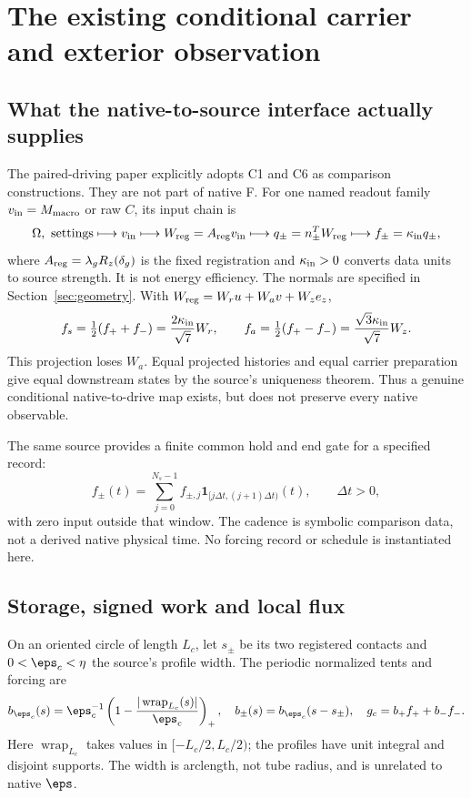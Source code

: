 \section{The existing conditional carrier and exterior observation}
\subsection{What the native-to-source interface actually supplies}
The paired-driving paper \cite{pairedII} explicitly adopts C1 and C6 as comparison constructions. They are not part of native F. For one named readout family $v_{\rm in}=M_{\rm macro}$ or raw $C$, its input chain is
\begin{equation}\label{eq:input}
 \Omega,\text{ settings}\longmapsto v_{\rm in}\longmapsto
 W_{\rm reg}=A_{\rm reg}v_{\rm in}\longmapsto
 q_\pm=n_\pm^TW_{\rm reg}\longmapsto f_\pm=\kappa_{\rm in}q_\pm,
\end{equation}
where $A_{\rm reg}=\lambda_gR_z(\delta_g)$ is the fixed registration and $\kappa_{\rm in}>0$ converts data units to source strength. It is not energy efficiency. The normals are specified in Section~\ref{sec:geometry}. With $W_{\rm reg}=W_ru+W_av+W_z e_z$,
\begin{equation}\label{eq:sectors}
 f_s=\tfrac12(f_++f_-)=\frac{2\kappa_{\rm in}}{\sqrt7}W_r,
 \qquad f_a=\tfrac12(f_+-f_-)=\frac{\sqrt3\kappa_{\rm in}}{\sqrt7}W_z.
\end{equation}
This projection loses $W_a$. Equal projected histories and equal carrier preparation give equal downstream states by the source's uniqueness theorem. Thus a genuine conditional native-to-drive map exists, but does not preserve every native observable.

The same source provides a finite common hold and end gate for a specified record:
\begin{equation}\label{eq:hold}
 f_\pm(t)=\sum_{j=0}^{N_s-1}f_{\pm,j}\mathbf1_{[j\Delta t,(j+1)\Delta t)}(t),
 \qquad \Delta t>0,
\end{equation}
with zero input outside that window. The cadence is symbolic comparison data, not a derived native physical time. No forcing record or schedule is instantiated here.

\subsection{Storage, signed work and local flux}
On an oriented circle of length $L_c$, let $s_\pm$ be its two registered contacts and $0<\eps_c<\eta$ the source's profile width. The periodic normalized tents and forcing are
\begin{equation}\label{eq:forcing}
 b_{\eps_c}(s)=\eps_c^{-1}\left(1-\frac{|\operatorname{wrap}_{L_c}(s)|}{\eps_c}\right)_+,
 \quad b_\pm(s)=b_{\eps_c}(s-s_\pm),\quad g_c=b_+f_++b_-f_-.
\end{equation}
Here $\operatorname{wrap}_{L_c}$ takes values in $[-L_c/2,L_c/2)$; the profiles have unit integral and disjoint supports. The width is arclength, not tube radius, and is unrelated to native $\eps$.

